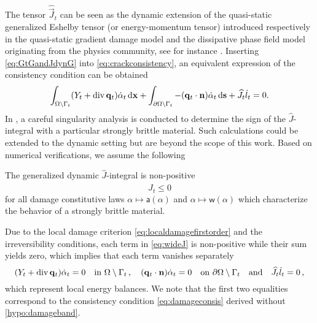 The tensor $\widehat{\vec{J}}_t$ can be seen as the dynamic extension of the quasi-static generalized Eshelby tensor (or energy-momentum tensor) introduced respectively in the quasi-static gradient damage model \cite{SicsicMarigo:2013} and the dissipative phase field model originating from the physics community, see for instance \cite{Ballarini:2016aa,HakimKarma:2009}. Inserting \eqref{eq:GtGandJdynG} into \eqref{eq:crackconsistency}, an equivalent expression of the consistency condition can be obtained
\begin{equation} \label{eq:wideJ}
\int_\domaint(Y_t+\div\vec{q}_t)\dot{\alpha}_t\dx+\int_{\partial\Omega\setminus\Gamma_t}-(\vec{q}_t\cdot\vec{n})\dot{\alpha}_t\ds+\widehat{J}_t\dot{l}_t=0.
\end{equation}
In \cite{SicsicMarigo:2013}, a careful singularity analysis is conducted to determine the sign of the $\widehat{J}$-integral with a particular strongly brittle material. Such calculations could be extended to the dynamic setting but are beyond the scope of this work. Based on numerical verifications, we assume the following
\begin{hypothesis} \label{eq:Jleq0}
The generalized dynamic $\widehat{J}$-integral is non-positive
\begin{equation} \label{eq:stab}
\widehat{J}_t\leq 0
\end{equation}
for all damage constitutive laws $\alpha\mapsto\mathsf{a}(\alpha)$ and $\alpha\mapsto\mathsf{w}(\alpha)$ which characterize the behavior of a strongly brittle material.
\end{hypothesis}
Due to the local damage criterion \eqref{eq:localdamagefirstorder} and the irreversibility conditions, each term in \eqref{eq:wideJ} is non-positive while their sum yields zero, which implies that each term vanishes separately
\begin{equation} \label{eq:ebG}
(Y_t+\div\vec{q}_t)\dot{\alpha}_t=0\quad\text{in }\domaint\,,\quad(\vec{q}_t\cdot\vec{n})\dot{\alpha}_t=0\quad\text{on }\partial\Omega\setminus\Gamma_t\quad\text{and}\quad\widehat{J}_t\dot{l}_t=0\,,
\end{equation}
which represent local energy balances. We note that the first two equalities correspond to the consistency condition \eqref{eq:damageconsis} derived without \cref{hypo:damageband}.

